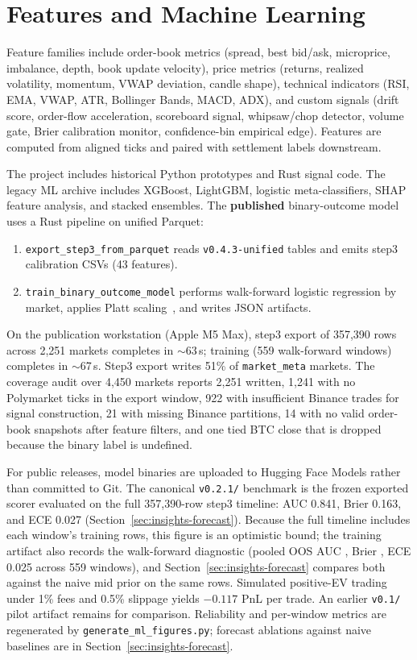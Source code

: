 \section{Features and Machine Learning}
\label{sec:ml}

Feature families include order-book metrics (spread, best bid/ask, microprice,
imbalance, depth, book update velocity), price metrics (returns, realized
volatility, momentum, VWAP deviation, candle shape), technical indicators (RSI,
EMA, VWAP, ATR, Bollinger Bands, MACD, ADX), and custom signals (drift score,
order-flow acceleration, scoreboard signal, whipsaw/chop detector, volume gate,
Brier calibration monitor, confidence-bin empirical edge). Features are
computed from aligned ticks and paired with settlement labels downstream.

The project includes historical Python prototypes and Rust signal code. The
legacy ML archive includes XGBoost, LightGBM, logistic meta-classifiers, SHAP
feature analysis, and stacked ensembles. The \textbf{published} binary-outcome
model uses a Rust pipeline on unified Parquet:

\begin{enumerate}
  \item \texttt{export\_step3\_from\_parquet} reads \texttt{v0.4.3-unified}
        tables and emits step3 calibration CSVs (43 features).
  \item \texttt{train\_binary\_outcome\_model} performs walk-forward logistic
        regression by market, applies Platt scaling~\cite{platt1999probabilistic},
        and writes JSON artifacts.
\end{enumerate}

On the publication workstation (Apple M5 Max), step3 export of 357{,}390 rows
across 2{,}251 markets completes in ${\sim}$63\,s; training (559 walk-forward
windows) completes in ${\sim}$67\,s. Step3 export writes 51\% of
\texttt{market\_meta} markets. The coverage audit over 4{,}450 markets reports
2{,}251 written, 1{,}241 with no Polymarket ticks in the export window, 922
with insufficient Binance trades for signal construction, 21 with missing
Binance partitions, 14 with no valid order-book snapshots after feature filters,
and one tied BTC close that is dropped because the binary label is undefined.

For public releases, model binaries are uploaded to Hugging Face Models rather
than committed to Git. The canonical \texttt{v0.2.1/} benchmark is the frozen
exported scorer evaluated on the full 357{,}390-row step3 timeline: AUC 0.841,
Brier 0.163, and ECE 0.027 (Section~\ref{sec:insights-forecast}). Because the
full timeline includes each window's training rows, this figure is an
optimistic bound; the training artifact also records the walk-forward
diagnostic (pooled OOS AUC \OpenMarketModelOosAuc{},
Brier \OpenMarketModelOosBrier{}, ECE 0.025 across 559 windows), and
Section~\ref{sec:insights-forecast} compares both against the naive mid prior
on the same rows.
Simulated positive-EV trading under 1\% fees and 0.5\% slippage yields
$-0.117$ PnL per trade. An earlier \texttt{v0.1/} pilot artifact remains for
comparison.
Reliability and per-window metrics are regenerated by
\texttt{generate\_ml\_figures.py}; forecast ablations against naive baselines
are in Section~\ref{sec:insights-forecast}.
